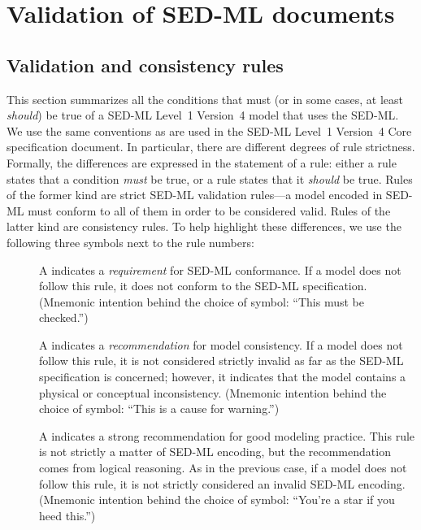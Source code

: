 
\section{Validation of SED-ML documents} 
\label{apdx-validation}

\subsection{Validation and consistency rules} 
\label{validation-rules}

This section summarizes all the conditions that must (or in some cases, at least \emph{should}) be true of a SED-ML Level~1 Version~4 model that uses the SED-ML. We use the same conventions as are used in the SED-ML Level~1 Version~4 Core specification document. In particular, there are different degrees of rule strictness. Formally, the differences are expressed in the statement of a rule: either a rule states that a condition \emph{must} be true, or a rule states that it \emph{should} be true. Rules of the former kind are strict SED-ML validation rules---a model encoded in SED-ML must conform to all of them in order to be considered valid. Rules of the latter kind are consistency rules. To help highlight these differences, we use the following three symbols next to the rule numbers:

\begin{description}

\item[\hspace*{6.5pt}\vSymbol\vsp] A \vSymbolName indicates a \emph{requirement} for SED-ML conformance. If a model does not follow this rule, it does not conform to the SED-ML specification. (Mnemonic intention behind the choice of symbol: ``This must be checked.'')

\item[\hspace*{6.5pt}\cSymbol\csp] A \cSymbolName indicates a \emph{recommendation} for model consistency. If a model does not follow this rule, it is not considered strictly invalid as far as the SED-ML specification is concerned; however, it indicates that the model contains a physical or conceptual inconsistency. (Mnemonic intention behind the choice of symbol: ``This is a cause for warning.'')

\item[\hspace*{6.5pt}\mSymbol\msp] A \mSymbolName indicates a strong recommendation for good modeling practice. This rule is not strictly a matter of SED-ML encoding, but the recommendation comes from logical reasoning. As in the previous case, if a model does not follow this rule, it is not strictly considered an invalid SED-ML encoding. (Mnemonic intention behind the choice of symbol: ``You're a star if you heed this.'')

\end{description}

